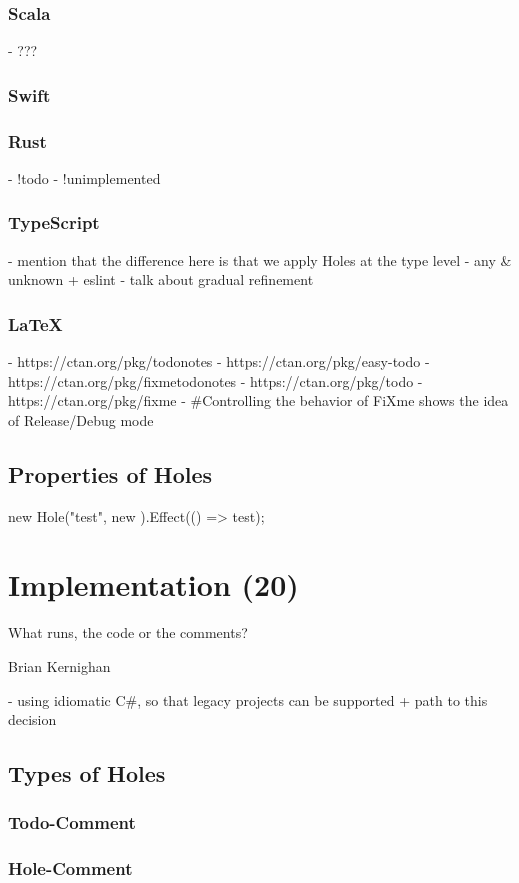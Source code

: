 \documentclass[master,english,smartquotes]{hgbthesis}
\begin{document}
\subsection{Scala}
- ???
\subsection{Swift}
\subsection{Rust}
- !todo
- !unimplemented
\subsection{TypeScript}
- mention that the difference here is that we apply Holes at the type level
- any \& unknown + eslint
- talk about gradual refinement
\subsection{\LaTeX}
- https://ctan.org/pkg/todonotes 
- https://ctan.org/pkg/easy-todo
- https://ctan.org/pkg/fixmetodonotes
- https://ctan.org/pkg/todo
- https://ctan.org/pkg/fixme
  - \#Controlling the behavior of FiXme shows the idea of Release/Debug mode
\section{Properties of Holes}

new Hole("test", new {  }).Effect(() => test);

\chapter{Implementation (20)}
\epigraph{What runs, the code or the comments?}{Brian Kernighan}
- using idiomatic C\#, so that legacy projects can be supported + path to this decision
\section{Types of Holes}
\subsection{Todo-Comment}
\subsection{Hole-Comment}
\end{document}

